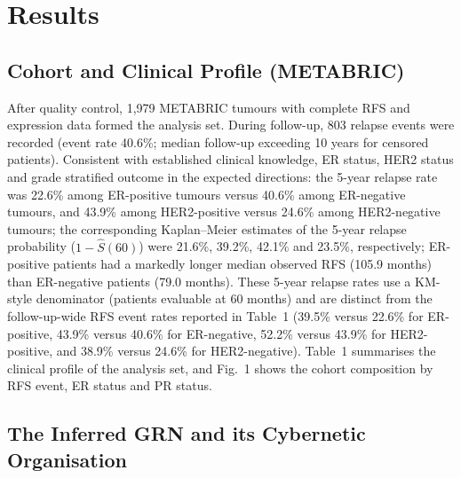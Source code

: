 \documentclass[12pt]{article}
\begin{document}
\section{Results}

\subsection{Cohort and Clinical Profile (METABRIC)}

After quality control, 1,979 METABRIC tumours with complete RFS and
expression data formed the analysis set. During follow-up, 803 relapse
events were recorded (event rate 40.6\%; median follow-up exceeding 10 years
for censored patients). Consistent with established clinical knowledge, ER
status, HER2 status and grade stratified outcome in the expected directions:
the 5-year relapse rate was 22.6\% among ER-positive tumours versus 40.6\%
among ER-negative tumours, and 43.9\% among HER2-positive versus 24.6\%
among HER2-negative tumours; the corresponding Kaplan--Meier estimates of
the 5-year relapse probability ($1 - \hat{S}(60)$) were 21.6\%, 39.2\%,
42.1\% and 23.5\%, respectively; ER-positive patients had a markedly longer
median observed RFS (105.9 months) than ER-negative patients (79.0 months).
These 5-year relapse rates use a KM-style denominator (patients evaluable at
60 months) and are distinct from the follow-up-wide RFS event rates reported
in Table~1 (39.5\% versus 22.6\% for ER-positive, 43.9\% versus 40.6\% for
ER-negative, 52.2\% versus 43.9\% for HER2-positive, and 38.9\% versus
24.6\% for HER2-negative). Table~1 summarises the clinical profile of the
analysis set, and Fig.~1 shows the cohort composition by RFS event, ER
status and PR status.

\subsection{The Inferred GRN and its Cybernetic Organisation}
\end{document}

